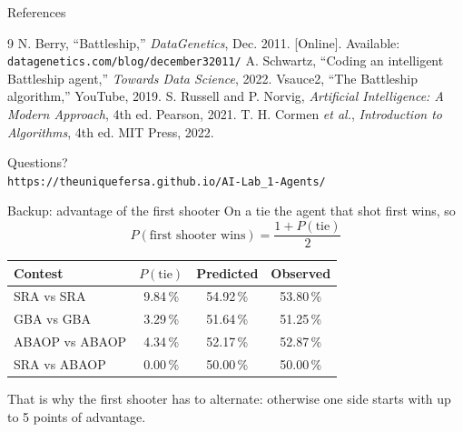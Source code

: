 \documentclass[aspectratio=169,11pt]{beamer}
\begin{document}
\begin{frame}{References}
\scriptsize
\begin{thebibliography}{9}
     N. Berry, ``Battleship,'' \emph{DataGenetics}, Dec. 2011. [Online]. Available: \texttt{datagenetics.com/blog/december32011/}
     A. Schwartz, ``Coding an intelligent Battleship agent,'' \emph{Towards Data Science}, 2022.
     Vsauce2, ``The Battleship algorithm,'' YouTube, 2019.
     S. Russell and P. Norvig, \emph{Artificial Intelligence: A Modern Approach}, 4th ed. Pearson, 2021.
     T. H. Cormen \emph{et al.}, \emph{Introduction to Algorithms}, 4th ed. MIT Press, 2022.
\end{thebibliography}
\end{frame}

\begin{frame}[standout]
Questions?\\[3mm]
{\normalsize\texttt{https://theuniquefersa.github.io/AI-Lab\_1-Agents/}}
\end{frame}

\appendix

\begin{frame}{Backup: advantage of the first shooter}
\centering\small
On a tie the agent that shot first wins, so
\[ P(\text{first shooter wins}) = \frac{1+P(\text{tie})}{2} \]
\vspace{-2mm}
\begin{tabular}{@{}lccc@{}}
\toprule
Contest & $P(\text{tie})$ & Predicted & Observed \\
\midrule
SRA vs SRA     & 9.84\,\% & 54.92\,\% & 53.80\,\% \\
GBA vs GBA     & 3.29\,\% & 51.64\,\% & 51.25\,\% \\
ABAOP vs ABAOP & 4.34\,\% & 52.17\,\% & 52.87\,\% \\
SRA vs ABAOP   & 0.00\,\% & 50.00\,\% & 50.00\,\% \\
\bottomrule
\end{tabular}
\vspace{2mm}

\footnotesize That is why the first shooter has to alternate: otherwise one side starts with up to 5 points of advantage.
\end{frame}
\end{document}
